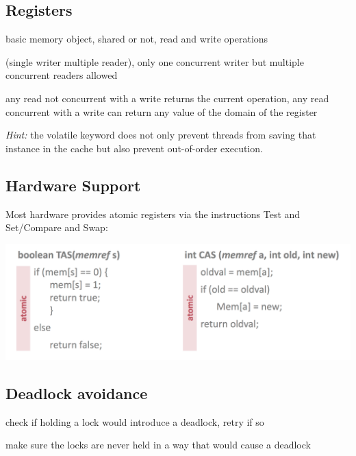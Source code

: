 \documentclass[11pt]{article}
\begin{document}
\subsection{Registers}

\begin{description}[noitemsep]
	\item[register] basic memory object, shared or not, read and write operations
	\item[SWMR] (single writer multiple reader), only one concurrent writer but multiple concurrent readers allowed
	\item[safe register] any read not concurrent with a write returns the current operation, any read concurrent with a write can return any value of the domain of the register
\end{description}

\emph{Hint:} the volatile keyword does not only prevent threads from saving that instance in the cache but also prevent out-of-order execution.

\subsection{Hardware Support}

Most hardware provides atomic registers via the instructions Test and Set/Compare and Swap:
\begin{center}
	\includegraphics[width=400pt]{images/hardware_support}
\end{center}

\subsection{Deadlock avoidance}

\begin{description}[noitemsep]
	\item[2 phase locking] check if holding a lock would introduce a deadlock, retry if so
	\item[resource ordering] make sure the locks are never held in a way that would cause a deadlock
\end{description}
\end{document}
